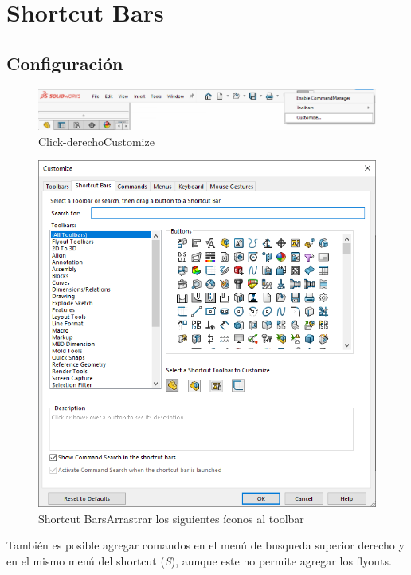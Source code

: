 \documentclass{report}
\begin{document}
\chapter{Shortcut Bars}

\section{Configuración}

\begin{figure}[H]
	\centering
	\includegraphics[width=0.95\linewidth, height=0.5\textheight,keepaspectratio]{Imagenes/solidworks_shortcutbars_01}
	\caption{Click-derecho\textrightarrow Customize}
	\label{fig:solidworksshortcutbars01}
\end{figure}

\begin{figure}[H]
	\centering
	\includegraphics[width=0.85\linewidth, height=0.5\textheight,keepaspectratio]{Imagenes/solidworks_shortcutbars_02}
	\caption{Shortcut Bars\textrightarrow Arrastrar los siguientes íconos al toolbar}
	\label{fig:solidworksshortcutbars02}
\end{figure}

También es posible agregar comandos en el menú de busqueda superior derecho y en el mismo menú del shortcut (\emph{S}), aunque este no permite agregar los flyouts.
\end{document}
